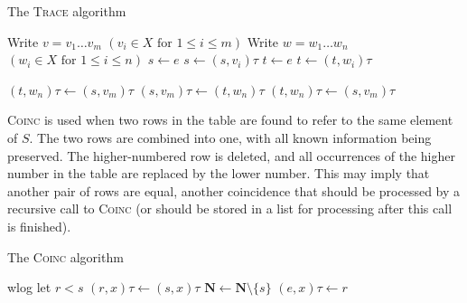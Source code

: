 \begin{algorithm}
\caption{The \textsc{Trace} algorithm}
\label{alg:trace}
\begin{algorithmic}[1]
\State Write $v = v_1 \dots v_m$ \Comment $(v_i \in X \text{~for~} 1 \leq i \leq m)$
\State Write $w = w_1 \dots w_n$ \Comment $(w_i \in X \text{~for~} 1 \leq i \leq n)$
\State $s \gets e$
    \State {}
  \EndIf
  \State $s \gets (s, v_i)\tau$
\EndFor
\State $t \gets e$
    \State {}
  \EndIf
  \State $t \gets (t, w_i)\tau$
\EndFor

  \State {}
  \State $(t, w_n)\tau \gets (s, v_m)\tau$
  \State $(s, v_m)\tau \gets (t, w_n)\tau$
  \State $(t, w_n)\tau \gets (s, v_m)\tau$
  \State {}
\EndIf

\EndProcedure
\end{algorithmic}
\end{algorithm}

\textsc{Coinc} is used when two rows in the table are found to refer to the same
element of $S$.  The two rows are combined into one, with all known information being
preserved.  The higher-numbered row is deleted, and all occurrences of the
higher number in the table are replaced by the lower number.  This may imply
that another pair of rows are equal, another coincidence that should be
processed by a recursive call to \textsc{Coinc} (or should be stored in a list
for processing after this call is finished).

\begin{algorithm}
\caption{The \textsc{Coinc} algorithm}
\label{alg:coinc}
\begin{algorithmic}[1]
\State wlog let $r < s$
    \State $(r, x)\tau \gets (s, x)\tau$
    \State {}
  \EndIf
\EndFor
\State $\mathbf{N} \gets \mathbf{N} \setminus \{s\}$
      \State $(e, x)\tau \gets r$
    \EndIf
  \EndFor
\EndFor
\EndProcedure
\end{algorithmic}
\end{algorithm}

